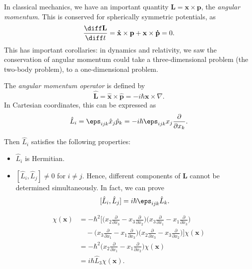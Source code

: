 \documentclass[12pt]{article}
\begin{document}
In classical mechanics, we have an important quantity $\mathbf{L} = \mathbf{x} \times \mathbf{p}$, the \textit{angular momentum}. This is conserved for spherically symmetric potentials, as
\[
\frac{\diff \mathbf{L}}{\diff t} = \mathbf{\dot x} \times \mathbf{p} + \mathbf{x} \times \mathbf{\dot p} = 0
.\]
This has important corollaries: in dynamics and relativity, we saw the conservation of angular momentum could take a three-dimensional problem (the two-body problem), to a one-dimensional problem.

\begin{definition}
	The \textit{angular momentum operator} is defined by
	\[
	\mathbf{\hat L} = \mathbf{\hat x} \times \mathbf{\hat p} = -i\hbar \mathbf{x} \times \nabla
	.\]
	In Cartesian coordinates, this can be expressed as
	\[
	\hat L_i = \eps_{ijk} \hat x_j \hat p_k = -i\hbar \eps_{ijk}x_j \frac{\partial}{\partial x_k}
	.\]
\end{definition}

Then $\hat L_i$ satisfies the following properties:
\begin{itemize}
	\item $\hat L_i$ is Hermitian.
	\item $[\hat L_i, \hat L_j] \neq 0$ for $i \neq j$. Hence, different components of $\mathbf{L}$ cannot be determined simultaneously. In fact, we can prove
		\[
			[\hat L_i, \hat L_j] = i \hbar \eps_{ijk} \hat L_k
		.\]
\end{itemize}

\begin{proofbox}
	\begin{align*}
		[\hat L_1, \hat L_2]\chi(\mathbf{x}) &= - \hbar^2 \biggl[ \biggl( x_2 \frac{\partial}{\partial x_3} - x_3 \frac{\partial}{\partial x_2} \biggr) \biggl( x_3 \frac{\partial}{\partial x_1} - x_1 \frac{\partial}{\partial x_3} \biggr) \\
						     & \quad - \biggl( x_3 \frac{\partial}{\partial x_1} - x_1 \frac{\partial}{\partial x_3} \biggr) \biggl( x_2 \frac{\partial}{\partial x_3} - x_3 \frac{\partial}{\partial x_2} \biggr) \biggr] \chi(\mathbf{x}) \\
						     &= - \hbar^2 \biggl(x_2 \frac{\partial}{\partial x_1} - x_1 \frac{\partial}{\partial x_2} \biggr) \chi(\mathbf{x}) \\
						     &= i \hbar \hat L_3 \chi(\mathbf{x}).
	\end{align*}
\end{proofbox}
\end{document}
